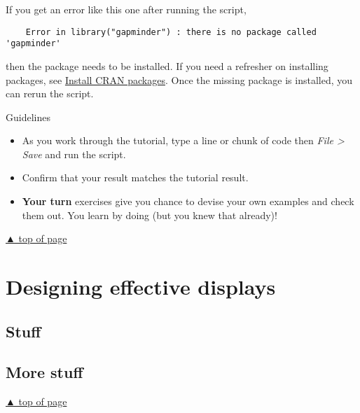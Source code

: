 \documentclass[
]{book}
\providecommand{\tightlist}{%
  \setlength{\itemsep}{0pt}\setlength{\parskip}{0pt}}
\begin{document}
If you get an error like this one after running the script,

\begin{verbatim}
    Error in library("gapminder") : there is no package called 'gapminder'
\end{verbatim}

then the package needs to be installed. If you need a refresher on installing packages, see \protect\hyperlink{install-cran-packages}{Install CRAN packages}. Once the missing package is installed, you can rerun the script.

Guidelines

\begin{itemize}
\tightlist
\item
  As you work through the tutorial, type a line or chunk of code then \emph{File \textgreater{} Save} and run the script.\\
\item
  Confirm that your result matches the tutorial result.\\
\item
  \textbf{Your turn} exercises give you chance to devise your own examples and check them out. You learn by doing (but you knew that already)!
\end{itemize}

\protect\hyperlink{start-with-R}{▲ top of page}

\hypertarget{display-design}{%
\chapter{Designing effective displays}\label{display-design}}

\hypertarget{stuff}{%
\section{Stuff}\label{stuff}}

\hypertarget{more-stuff}{%
\section{More stuff}\label{more-stuff}}

\protect\hyperlink{display-design}{▲ top of page}

  
\end{document}
